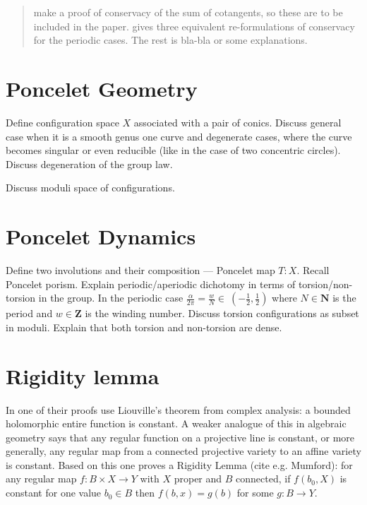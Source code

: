 \documentclass[12pt]{article}
\numberwithin{equation}{section}
\newcommand\N{\mathbf{N}}                    %
\newcommand\Z{\mathbf{Z}}                    %
\begin{document}
\begin{abstract}
 make a proof of conservacy of
the sum of cotangents, so these are to be included in the paper.
 gives three equivalent re-formulations of conservacy
for the periodic cases.
The rest is bla-bla or some explanations.
\end{abstract}
\tableofcontents 

\section{Poncelet Geometry}

Define configuration space $X$ associated with a pair of conics.
Discuss general case when it is a smooth genus one curve
and degenerate cases, where the curve becomes singular
or even reducible (like in the case of two concentric circles).
Discuss degeneration of the group law.

Discuss moduli space of configurations.

\section{Poncelet Dynamics}

Define two involutions and their composition --- Poncelet map $T : X$.
Recall Poncelet porism.
Explain periodic/aperiodic dichotomy in terms of torsion/non-torsion in the group.
In the periodic case $\frac{α}{2π} = \frac{w}{N} \in\ (-\frac12,\frac12)$ where $N\in\N$ is the period and $w\in\Z$ is the winding number.
Discuss torsion configurations as subset in moduli.
Explain that both torsion and non-torsion are dense.


\section{Rigidity lemma}

In one of their proofs
\cite{AST} use Liouville's theorem from complex analysis:
a bounded holomorphic entire function is constant.
A weaker analogue of this in algebraic geometry says that any regular function
on a projective line is constant, or more generally,
any regular map from a connected projective variety to an affine variety is constant.
Based on this one proves a Rigidity Lemma (cite e.g. Mumford):
for any regular map $f: B\times X\to Y$ with $X$ proper and $B$ connected,
if $f(b_0,X)$ is constant for one value $b_0\in B$ then $f(b,x) = g(b)$ for some $g: B\to Y$.
\end{document}
